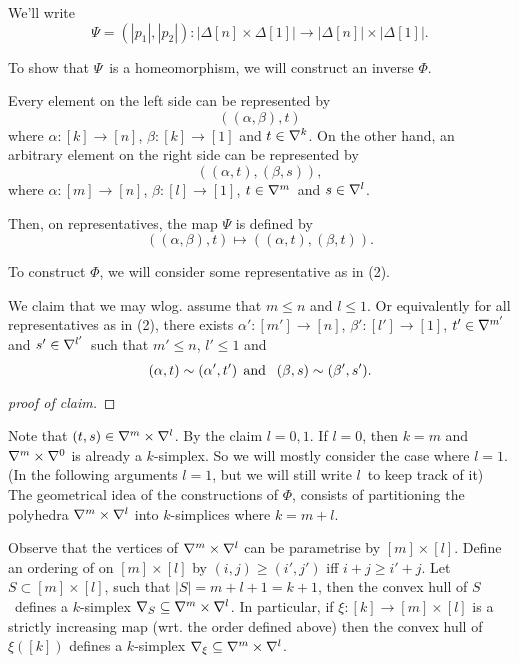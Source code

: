\documentclass[a4paper,11pt,english]{article}
\begin{document}
\begin{exercise}[2]
We'll write 
\[ \Psi = (|p_1|, |p_2|) : |\Delta[n] \times \Delta[1]| \to |\Delta[n]|\times
|\Delta[1]|. \]

To show that $\Psi$ is a homeomorphism, we will construct an inverse $\Phi$.

Every element on the left side can be represented by
\begin{equation}
\label{eq:1}
\left((\alpha, \beta), t\right)
\end{equation}
where $\alpha : [k] \to [n]$, $\beta: [k] \to [1]$ and $t \in \nabla^k$.
On the other hand, an arbitrary element on the right side can be represented by
\begin{equation}
\label{eq:2}
\left((\alpha,t), (\beta, s)\right),
\end{equation}
where $\alpha: [m] \to [n]$, $\beta: [l] \to [1]$, $t \in \nabla^m$ and
$s\in\nabla^l$.

Then, on representatives, the map $\Psi$ is defined by
\[ ((\alpha,\beta), t) \mapsto ((\alpha,t), (\beta,t)). \]

To construct $\Phi$, we will consider some representative as in (2). 

We claim that we may wlog. assume that $m \le n$ and $l \le 1$. Or equivalently 
for all representatives as in (2), there exists $\alpha':
[m'] \to [n]$, $\beta': [l'] \to [1]$, $t'\in \nabla^{m'}$ and $s'\in
\nabla^{l'}$ such that $m' \le n$, $l' \le 1$ and 
\[ (\alpha,t) \sim (\alpha',t') \:\:\text{and }\:\: (\beta,s) \sim (\beta',s'). \]

\begin{proof}[proof of claim]
\end{proof}

Note that $(t,s) \in \nabla^m \times \nabla^l$. By the claim $l = 0,1$. If $l = 0$, then $k=m$
and $\nabla^m \times \nabla^0$ is already a $k$-simplex. So we will mostly consider
the case where $l=1$. (In the following arguments $l=1$, but we will still write
$l$ to keep track of it)
The geometrical idea of the constructions of $\Phi$,
consists of partitioning the polyhedra $\nabla^m \times \nabla^l$ into $k$-simplices 
where $k = m + l$.

Observe that the vertices of $\nabla^m \times \nabla^l$ can be parametrise by
$[m] \times [l]$. Define an ordering of on $[m] \times [l]$ by 
$(i,j) \ge (i',j')$ iff $i+j \ge i'+j$. 
Let $S\subset [m]\times [l]$, such that $|S| = m+l+1 = k+1$, then the convex hull
of $S$ defines a $k$-simplex $\nabla_S \subseteq \nabla^m \times \nabla^l$. 
In particular, if $\xi: [k] \to [m]\times[l]$ is a strictly increasing map 
(wrt. the order defined above) then the convex hull of $\xi([k])$ defines a 
$k$-simplex $\nabla_\xi \subseteq \nabla^m \times \nabla^l$.


\end{exercise}
\end{document}
